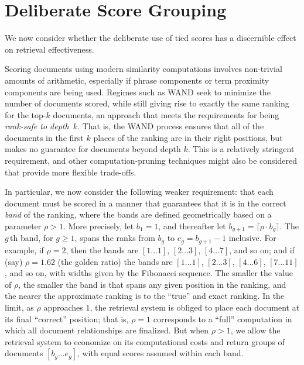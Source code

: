 \section{Deliberate Score Grouping}
\label{sec-roundingoff}

We now consider whether the deliberate use of tied scores
has a discernible effect on retrieval effectiveness.


Scoring documents using modern similarity computations involves
non-trivial amounts of arithmetic, especially if phrase components or
term proximity components are being used.
Regimes such as WAND {\citep{bchsz03cikm}} seek to minimize the
number of documents scored, while still giving rise to exactly the
same ranking for the top-$k$ documents, an approach that meets the
requirements for being {\emph{rank-safe to depth~$k$}}.
That is, the WAND process ensures that all of the documents in the
first $k$ places of the ranking are in their right positions, but
makes no guarantee for documents beyond depth $k$.
This is a relatively stringent requirement, and other
computation-pruning techniques might also be considered that provide
more flexible trade-offs.

In particular, we now consider the following weaker requirement: that
each document must be scored in a manner that guarantees that it is
in the correct {\emph{band}} of the ranking, where the bands are
defined geometrically based on a parameter $\rho>1$.
More precisely, let $b_1=1$, and thereafter let
$b_{g+1}=\lceil{\rho\cdot b_g}\rceil$.
The $g$\,th band, for $g\ge1$, spans the ranks from $b_g$ to
$e_g=b_{g+1}-1$ inclusive.
For example, if $\rho=2$, then the bands are $[1\ldots1]$,
$[2\ldots3]$, $[4\ldots7]$, and so on; and if (say) $\rho=1.62$ (the
golden ratio) the bands are $[1\ldots1]$, $[2\ldots3]$, $[4\ldots6]$,
$[7\ldots11]$, and so on, with widths given by the Fibonacci
sequence.
The smaller the value of $\rho$, the smaller the band is that spans
any given position in the ranking, and the nearer the approximate
ranking is to the ``true'' and exact ranking.
In the limit, as $\rho$ approaches $1$, the retrieval system is
obliged to place each document at its final ``correct'' position; that is,
$\rho=1$ corresponds to a ``full'' computation in which all document
relationships are finalized.
But when $\rho>1$, we allow the retrieval system to economize on its
computational costs and return groups of documents $[b_g\ldots e_g]$,
with equal scores assumed within each band.

